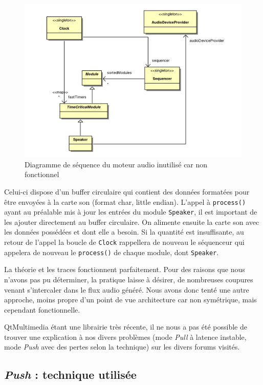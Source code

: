 \begin{figure}[htb]
\centering
\includegraphics[width=17cm]{../img/ps/psm_unusedAudioEngine.pdf}
\caption{Diagramme de séquence du moteur audio inutilisé car non fonctionnel}
\end{figure}
Celui-ci dispose d'un buffer circulaire qui contient des données
formatées pour être envoyées à la carte son (format char, little
endian). L'appel à \verb!process()! ayant au préalable mis à jour
les entrées du module \verb!Speaker!, il est important de les
ajouter directement au buffer circulaire. On alimente ensuite la
carte son avec les données possédées et dont elle a besoin. Si la
quantité est insuffisante, au retour de l'appel la boucle de
\verb!Clock! rappellera de nouveau le séquenceur qui appelera de
nouveau le \verb!process()! de chaque module, dont \verb!Speaker!.

La théorie et les traces fonctionnent parfaitement. Pour des
raisons que nous n'avons pas pu déterminer, la pratique laisse à
désirer, de nombreuses coupures venant s'intercaler dans le flux
audio généré. Nous avons donc tenté une autre approche, moins
propre d'un point de vue architecture car non symétrique, mais
cependant fonctionnelle.

QtMultimedia étant une librairie très récente, il ne nous a pas été
possible de trouver une explication à nos divers problèmes (mode
\emph{Pull} à latence instable, mode \emph{Push} avec des pertes
selon la technique) sur les divers forums visités.

\subsection{\emph{Push} : technique utilisée}

